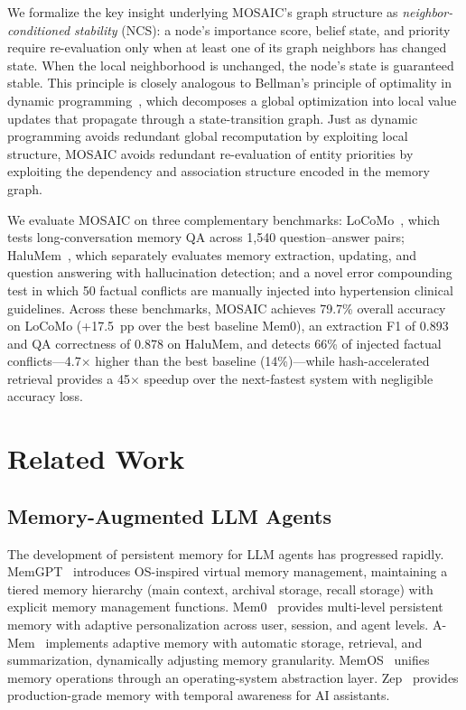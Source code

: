 \documentclass[10pt,twocolumn]{article}
\begin{document}
We formalize the key insight underlying MOSAIC's graph structure as
\emph{neighbor-conditioned stability} (NCS): a node's importance score,
belief state, and priority require re-evaluation only when at least one of
its graph neighbors has changed state. When the local neighborhood is
unchanged, the node's state is guaranteed stable. This principle is closely
analogous to Bellman's principle of optimality in dynamic
programming~\citep{bellman1966dynamic}, which decomposes a global
optimization into local value updates that propagate through a
state-transition graph. Just as dynamic programming avoids redundant
global recomputation by exploiting local structure, MOSAIC avoids redundant
re-evaluation of entity priorities by exploiting the dependency and
association structure encoded in the memory graph.

We evaluate MOSAIC on three complementary benchmarks: LoCoMo~\citep{maharana2024evaluating}, which tests long-conversation memory QA across 1,540 question--answer pairs; HaluMem~\citep{chen2025halumem}, which separately evaluates memory extraction, updating, and question answering with hallucination detection; and a novel error compounding test in which 50 factual conflicts are manually injected into hypertension clinical guidelines. Across these benchmarks, MOSAIC achieves 79.7\% overall accuracy on LoCoMo (+17.5~pp over the best baseline Mem0), an extraction F1 of 0.893 and QA correctness of 0.878 on HaluMem, and detects 66\% of injected factual conflicts---4.7$\times$ higher than the best baseline (14\%)---while hash-accelerated retrieval provides a 45$\times$ speedup over the next-fastest system with negligible accuracy loss.

\section{Related Work}
\label{sec:related}

\subsection{Memory-Augmented LLM Agents}

The development of persistent memory for LLM agents has progressed rapidly.
MemGPT~\citep{packer2023memgpt} introduces OS-inspired virtual memory
management, maintaining a tiered memory hierarchy (main context, archival
storage, recall storage) with explicit memory management functions.
Mem0~\citep{chhikara2025mem0} provides multi-level persistent memory with adaptive
personalization across user, session, and agent levels.
A-Mem~\citep{xu2025mem} implements adaptive memory with automatic storage,
retrieval, and summarization, dynamically adjusting memory granularity.
MemOS~\citep{li2025memos} unifies memory operations through an
operating-system abstraction layer.
Zep~\citep{rasmussen2025zep} provides production-grade memory with temporal awareness
for AI assistants.
\end{document}
